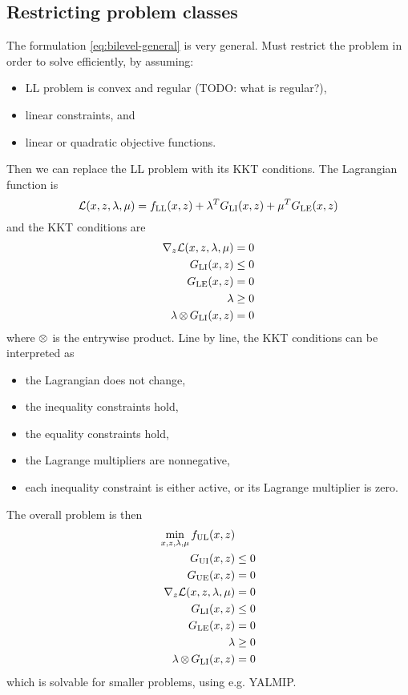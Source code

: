 \subsection{Restricting problem classes}
The formulation \eqref{eq:bilevel-general} is very general. Must restrict the problem in order to solve efficiently, by assuming:
%
\begin{itemize}
  \item LL problem is convex and regular (TODO: what is regular?),
  \item linear constraints, and
  \item linear or quadratic objective functions.
\end{itemize}
%
Then we can replace the LL problem with its KKT conditions. The Lagrangian function is
%
\begin{equation}
  \mathcal{L}(x,z,\lambda,\mu) = f_\mathrm{LL}(x,z) + \lambda^T G_\mathrm{LI}(x,z) + \mu^T G_\mathrm{LE}(x,z)
\end{equation}
%
and the KKT conditions are
%
\begin{equation}
  \begin{split}
    \nabla_z \mathcal{L}(x,z,\lambda,\mu) &= 0 \\
    G_\mathrm{LI}(x,z) &\leq 0 \\
    G_\mathrm{LE}(x,z) &= 0 \\
    \lambda &\geq 0 \\
    \lambda \operatorname{\otimes} G_\mathrm{LI}(x,z) &= 0
  \end{split}
\end{equation}
%
where $\operatorname{\otimes}$ is the entrywise product. Line by line, the KKT conditions can be interpreted as
%
\begin{itemize}
  \item the Lagrangian does not change,
  \item the inequality constraints hold,
  \item the equality constraints hold,
  \item the Lagrange multipliers are nonnegative,
  \item each inequality constraint is either active, or its Lagrange multiplier is zero.
\end{itemize}
%
The overall problem is then
%
\begin{equation}
  \begin{split}
    \min_{x,z,\lambda,\mu} f_\mathrm{UL}(x,z) & \\
    G_\mathrm{UI}(x,z) & \leq 0 \\
    G_\mathrm{UE}(x,z) &= 0 \\
    \nabla_z \mathcal{L}(x,z,\lambda,\mu) &= 0 \\
    G_\mathrm{LI}(x,z) &\leq 0 \\
    G_\mathrm{LE}(x,z) &= 0 \\
    \lambda &\geq 0 \\
    \lambda \operatorname{\otimes} G_\mathrm{LI}(x,z) &= 0 \\
  \end{split}
\end{equation}
%
which is solvable for smaller problems, using e.g. YALMIP.

